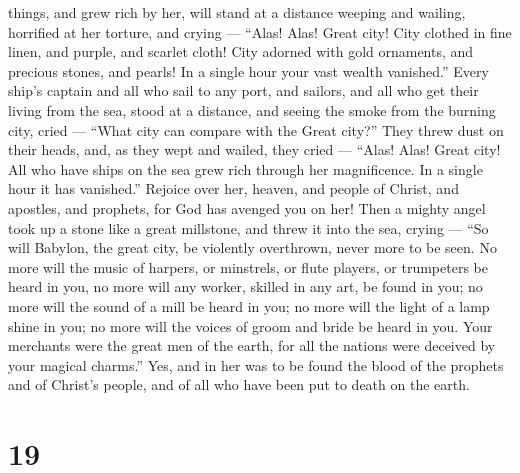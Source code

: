 things, and grew rich by her, will stand at a distance weeping and
wailing, horrified at her torture, and crying ---  ``Alas!
Alas! Great city! City clothed in fine linen, and purple, and scarlet
cloth! City adorned with gold ornaments, and precious stones, and
pearls!  In a single hour your vast wealth vanished.''
Every ship's captain and all who sail to any port, and sailors, and all
who get their living from the sea, stood at a distance, 
and seeing the smoke from the burning city, cried --- ``What city can
compare with the Great city?''  They threw dust on their
heads, and, as they wept and wailed, they cried --- ``Alas! Alas! Great
city! All who have ships on the sea grew rich through her magnificence.
In a single hour it has vanished.''  Rejoice over her,
heaven, and people of Christ, and apostles, and prophets, for God has
avenged you on her!  Then a mighty angel took up a stone
like a great millstone, and threw it into the sea, crying --- ``So will
Babylon, the great city, be violently overthrown, never more to be seen.
 No more will the music of harpers, or minstrels, or flute
players, or trumpeters be heard in you, no more will any worker, skilled
in any art, be found in you; no more will the sound of a mill be heard
in you;  no more will the light of a lamp shine in you; no
more will the voices of groom and bride be heard in you. Your merchants
were the great men of the earth, for all the nations were deceived by
your magical charms.''  Yes, and in her was to be found the
blood of the prophets and of Christ's people, and of all who have been
put to death on the earth.

\hypertarget{section-18}{%
\section{19}\label{section-18}}

